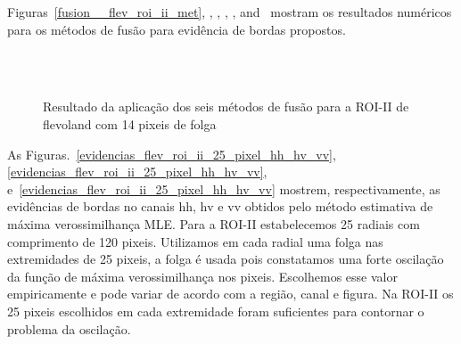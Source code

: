 Figuras~\ref{fusion__flev_roi_ii_met}, , , , , and~ mostram os resultados numéricos para os métodos de fusão para evidência de bordas propostos.
\begin{figure}[hbt]
	\centering
     \\
     \\
     \caption{Resultado da aplicação dos seis métodos de fusão para a ROI-II de flevoland com 14 pixeis de folga}
     \label{fusion_flev_roi_ii_met}
\end{figure}
As Figuras.~\ref{evidencias_flev_roi_ii_25_pixel_hh_hv_vv}, \ref{evidencias_flev_roi_ii_25_pixel_hh_hv_vv}, e~\ref{evidencias_flev_roi_ii_25_pixel_hh_hv_vv} mostrem, respectivamente, as evidências de bordas no canais $\text{hh}$, $\text{hv}$ e $\text{vv}$ obtidos pelo método estimativa de máxima verossimilhança MLE. Para a ROI-II estabelecemos 25 radiais com comprimento de 120 pixeis. Utilizamos em cada radial uma folga nas extremidades de  25 pixeis, a folga é usada pois constatamos uma forte oscilação da função de máxima verossimilhança nos pixeis. Escolhemos esse valor empiricamente e pode variar de acordo com a região, canal e figura. Na ROI-II os 25 pixeis escolhidos em cada extremidade foram suficientes para contornar o problema da oscilação.  
